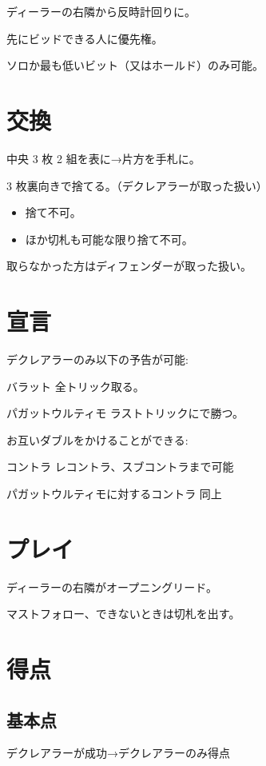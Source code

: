 \documentclass[line_length=50zw,head_space=2cm,foot_space=2cm]{jlreq}
\begin{document}
\begin{multicols}{2}
	ディーラーの右隣から反時計回りに。
	
	先にビッドできる人に優先権。
	
	ソロか最も低いビット（又はホールド）のみ可能。
	
	\section{交換}
	中央 3 枚 2 組を表に→片方を手札に。
	
	3 枚裏向きで捨てる。（デクレアラーが取った扱い）
	
	\begin{itemize}
		\item {}    捨て不可。
		\item ほか切札も可能な限り捨て不可。
	\end{itemize}
	
	取らなかった方はディフェンダーが取った扱い。
	
	\columnbreak
	
	\section{宣言}
	デクレアラーのみ以下の予告が可能:
	\begin{desc}
		\item[バラット] 全トリック取る。
		\item[パガットウルティモ] ラストトリックにで勝つ。
	\end{desc}
	
	お互いダブルをかけることができる:
	\begin{desc}
		\item[コントラ] レコントラ、スブコントラまで可能
		\item[パガットウルティモに対するコントラ] 同上
	\end{desc}
	
	\section{プレイ}
	ディーラーの右隣がオープニングリード。
	
	マストフォロー、できないときは切札を出す。
	
	\section{得点}
	\subsection*{基本点}
	デクレアラーが成功→デクレアラーのみ得点
	

\end{multicols}
\end{document}
